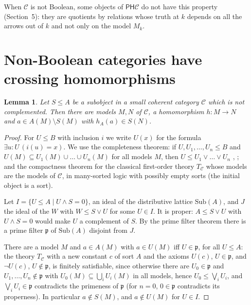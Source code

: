 \documentclass[11pt]{amsart}
\newtheorem{lem}[thm]{Lemma}
\theoremstyle{definition}
\newcommand{\Sub}{\mathrm{Sub}}
\newcommand{\PP}{\mathsf P}
\newcommand{\HH}{\mathsf H}
\newcommand{\cC}{\mathcal C}
\begin{document}
When $\cC$ is not Boolean, some objects of $\PP\HH\cC$ do not have this
property (Section~5): they are quotients by relations whose truth at
$k$ depends on all the arrows out of $k$ and not only on the model
$M_k$.

\section{Non-Boolean categories have crossing homomorphisms}

\begin{lem}\label{lem:cross}
Let $S\le A$ be a subobject in a small coherent category $\cC$ which is
not complemented. Then there are models $M,N$ of $\cC$, a homomorphism
$h\colon M\to N$ and $a\in A(M)\setminus S(M)$ with $h_A(a)\in S(N)$.
\end{lem}
\begin{proof}
For $U\le B$ with inclusion $i$ we write $U(x)$ for the formula $\exists
u{:}U\,(i(u)=x)$. We use the completeness theorem: if $U,U_1,\dots,U_n\le B$ and
$U(M)\subseteq U_1(M)\cup\dots\cup U_n(M)$ for all models $M$, then
$U\le U_1\vee\dots\vee U_n$ \cite[D1.5]{Elephant}, \cite{MR77}; and the
compactness theorem for the classical first-order theory $T_\cC$ whose
models are the models of $\cC$, in many-sorted logic with possibly
empty sorts (the initial object is a sort).

Let $I=\{U\le A\mid U\wedge S=0\}$, an ideal of the distributive
lattice $\Sub(A)$, and $J$ the ideal of the $W$ with $W\le S\vee U$ for
some $U\in I$. It is proper: $A\le S\vee U$ with $U\wedge S=0$ would
make $U$ a complement of $S$. By the prime filter theorem there is a
prime filter $\mathfrak p$ of $\Sub(A)$ disjoint from $J$.

There are a model $M$ and $a\in A(M)$ with $a\in U(M)$ iff
$U\in\mathfrak p$, for all $U\le A$: the theory $T_\cC$ with a new
constant $c$ of sort $A$ and the axioms $U(c)$, $U\in\mathfrak p$, and
$\neg U(c)$, $U\notin\mathfrak p$, is finitely satisfiable, since
otherwise there are $U_0\in\mathfrak p$ and $U_1,\dots,U_n\notin
\mathfrak p$ with $U_0(M)\subseteq\bigcup_iU_i(M)$ in all models, hence
$U_0\le\bigvee_iU_i$, and $\bigvee_iU_i\in\mathfrak p$ contradicts the
primeness of $\mathfrak p$ (for $n=0$, $0\in\mathfrak p$ contradicts
its properness). In particular $a\notin S(M)$, and $a\notin U(M)$ for
$U\in I$.


\end{proof}
\end{document}
